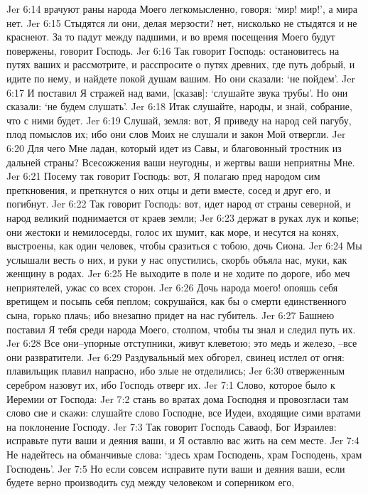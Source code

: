 Jer 6:14  врачуют раны народа Моего легкомысленно, говоря: `мир! мир!', а мира нет.
Jer 6:15  Стыдятся ли они, делая мерзости? нет, нисколько не стыдятся и не краснеют. За то падут между падшими, и во время посещения Моего будут повержены, говорит Господь.
Jer 6:16  Так говорит Господь: остановитесь на путях ваших и рассмотрите, и расспросите о путях древних, где путь добрый, и идите по нему, и найдете покой душам вашим. Но они сказали: `не пойдем'.
Jer 6:17  И поставил Я стражей над вами, [сказав]: `слушайте звука трубы'. Но они сказали: `не будем слушать'.
Jer 6:18  Итак слушайте, народы, и знай, собрание, что с ними будет.
Jer 6:19  Слушай, земля: вот, Я приведу на народ сей пагубу, плод помыслов их; ибо они слов Моих не слушали и закон Мой отвергли.
Jer 6:20  Для чего Мне ладан, который идет из Савы, и благовонный тростник из дальней страны? Всесожжения ваши неугодны, и жертвы ваши неприятны Мне.
Jer 6:21  Посему так говорит Господь: вот, Я полагаю пред народом сим преткновения, и преткнутся о них отцы и дети вместе, сосед и друг его, и погибнут.
Jer 6:22  Так говорит Господь: вот, идет народ от страны северной, и народ великий поднимается от краев земли;
Jer 6:23  держат в руках лук и копье; они жестоки и немилосерды, голос их шумит, как море, и несутся на конях, выстроены, как один человек, чтобы сразиться с тобою, дочь Сиона.
Jer 6:24  Мы услышали весть о них, и руки у нас опустились, скорбь объяла нас, муки, как женщину в родах.
Jer 6:25  Не выходите в поле и не ходите по дороге, ибо меч неприятелей, ужас со всех сторон.
Jer 6:26  Дочь народа моего! опояшь себя вретищем и посыпь себя пеплом; сокрушайся, как бы о смерти единственного сына, горько плачь; ибо внезапно придет на нас губитель.
Jer 6:27  Башнею поставил Я тебя среди народа Моего, столпом, чтобы ты знал и следил путь их.
Jer 6:28  Все они--упорные отступники, живут клеветою; это медь и железо, --все они развратители.
Jer 6:29  Раздувальный мех обгорел, свинец истлел от огня: плавильщик плавил напрасно, ибо злые не отделились;
Jer 6:30  отверженным серебром назовут их, ибо Господь отверг их.
Jer 7:1  Слово, которое было к Иеремии от Господа:
Jer 7:2  стань во вратах дома Господня и провозгласи там слово сие и скажи: слушайте слово Господне, все Иудеи, входящие сими вратами на поклонение Господу.
Jer 7:3  Так говорит Господь Саваоф, Бог Израилев: исправьте пути ваши и деяния ваши, и Я оставлю вас жить на сем месте.
Jer 7:4  Не надейтесь на обманчивые слова: `здесь храм Господень, храм Господень, храм Господень'.
Jer 7:5  Но если совсем исправите пути ваши и деяния ваши, если будете верно производить суд между человеком и соперником его,
